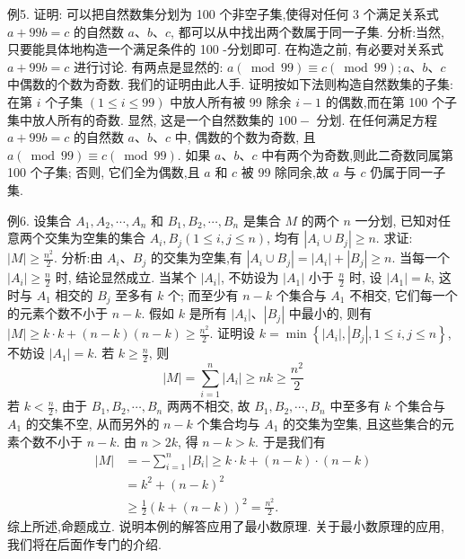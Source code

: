 例5. 证明: 可以把自然数集分划为 100 个非空子集,使得对任何 3 个满足关系式 $a+99 b=c$ 的自然数 $a 、 b 、 c$, 都可以从中找出两个数属于同一子集.
分析:当然, 只要能具体地构造一个满足条件的 100 -分划即可.
在构造之前, 有必要对关系式 $a+99 b=c$ 进行讨论.
有两点是显然的: $a(\bmod 99) \equiv c(\bmod 99) ; a 、 b 、 c$ 中偶数的个数为奇数.
我们的证明由此人手.
证明按如下法则构造自然数集的子集: 在第 $i$ 个子集 $(1 \leqslant i \leqslant 99)$ 中放人所有被 99 除余 $i-1$ 的偶数,而在第 100 个子集中放人所有的奇数.
显然, 这是一个自然数集的 $100-$ 分划.
在任何满足方程 $a+99 b=c$ 的自然数 $a 、 b 、 c$ 中, 偶数的个数为奇数, 且
$a(\bmod 99) \equiv c(\bmod 99)$.
如果 $a 、 b 、 c$ 中有两个为奇数,则此二奇数同属第 100 个子集; 否则, 它们全为偶数,且 $a$ 和 $c$ 被 99 除同余,故 $a$ 与 $c$ 仍属于同一子集.



例6. 设集合 $A_1, A_2, \cdots, A_n$ 和 $B_1, B_2, \cdots, B_n$ 是集合 $M$ 的两个 $n$ 一分划, 已知对任意两个交集为空集的集合 $A_i, B_j(1 \leqslant i, j \leqslant n)$, 均有 $\left|A_i \cup B_j\right| \geqslant n$. 求证: $|M| \geqslant \frac{n^2}{2}$.
分析:由 $A_i 、 B_j$ 的交集为空集,有 $\left|A_i \cup B_j\right|=\left|A_i\right|+\left|B_j\right| \geqslant n$. 当每一个 $\left|A_i\right| \geqslant \frac{n}{2}$ 时, 结论显然成立.
当某个 $\left|A_i\right|$, 不妨设为 $\left|A_1\right|$ 小于 $\frac{n}{2}$ 时, 设 $\left|A_1\right|=k$, 这时与 $A_1$ 相交的 $B_j$ 至多有 $k$ 个; 而至少有 $n-k$ 个集合与 $A_1$ 不相交, 它们每一个的元素个数不小于 $n-k$. 假如 $k$ 是所有 $\left|A_i\right| 、\left|B_j\right|$ 中最小的, 则有 $|M| \geqslant k \cdot k+(n-k)(n-k) \geqslant \frac{n^2}{2}$.
证明设 $k=\min \left\{\left|A_i\right|,\left|B_j\right|, 1 \leqslant i, j \leqslant n\right\}$, 不妨设 $\left|A_1\right|=k$.
若 $k \geqslant \frac{n}{2}$, 则
$$
|M|=\sum_{i=1}^n\left|A_i\right| \geqslant n k \geqslant \frac{n^2}{2}
$$
若 $k<\frac{n}{2}$, 由于 $B_1, B_2, \cdots, B_n$ 两两不相交, 故 $B_1, B_2, \cdots, B_n$ 中至多有 $k$ 个集合与 $A_1$ 的交集不空, 从而另外的 $n-k$ 个集合均与 $A_1$ 的交集为空集, 且这些集合的元素个数不小于 $n-k$. 由 $n>2 k$, 得 $n-k>k$. 于是我们有
$$
\begin{aligned}
|M| & =-\sum_{i=1}^n\left|B_i\right| \geqslant k \cdot k+(n-k) \cdot(n-k) \\
& =k^2+(n-k)^2 \\
& \geqslant \frac{1}{2}(k+(n-k))^2=\frac{n^2}{2} .
\end{aligned}
$$
综上所述,命题成立.
说明本例的解答应用了最小数原理.
关于最小数原理的应用, 我们将在后面作专门的介绍.



